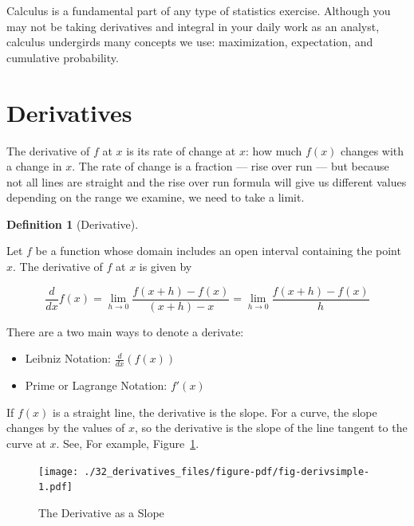 \documentclass[
  letterpaper,
]{book}
\providecommand{\tightlist}{%
  \setlength{\itemsep}{0pt}\setlength{\parskip}{0pt}}\usepackage{longtable,booktabs,array}
\theoremstyle{definition}
\newtheorem{definition}{Definition}[chapter]
\theoremstyle{definition}
\theoremstyle{plain}
\theoremstyle{definition}
\theoremstyle{plain}
\theoremstyle{plain}
\theoremstyle{remark}
\begin{document}
Calculus is a fundamental part of any type of statistics exercise.
Although you may not be taking derivatives and integral in your daily
work as an analyst, calculus undergirds many concepts we use:
maximization, expectation, and cumulative probability.

\hypertarget{sec-derivintro}{%
\section{Derivatives}\label{sec-derivintro}}

The derivative of \(f\) at \(x\) is its rate of change at \(x\): how
much \(f(x)\) changes with a change in \(x\). The rate of change is a
fraction --- rise over run --- but because not all lines are straight
and the rise over run formula will give us different values depending on
the range we examine, we need to take a limit.

\leavevmode{}%
\begin{definition}[Derivative]\label{def-derivative}

Let \(f\) be a function whose domain includes an open interval
containing the point \(x\). The derivative of \(f\) at \(x\) is given by

\[\frac{d}{dx}f(x) =\lim\limits_{h\to 0} \frac{f(x+h)-f(x)}{(x+h)-x} = \lim\limits_{h\to 0} \frac{f(x+h)-f(x)}{h}\]

There are a two main ways to denote a derivate:

\begin{itemize}
\tightlist
\item
  Leibniz Notation: \(\frac{d}{dx}(f(x))\)
\item
  Prime or Lagrange Notation: \(f'(x)\)
\end{itemize}

\end{definition}

If \(f(x)\) is a straight line, the derivative is the slope. For a
curve, the slope changes by the values of \(x\), so the derivative is
the slope of the line tangent to the curve at \(x\). See, For example,
Figure~\ref{fig-derivsimple}.

\begin{figure}

{\centering \texttt{[image: ./32\_derivatives\_files/figure-pdf/fig-derivsimple-1.pdf]}

}

\caption{\label{fig-derivsimple}The Derivative as a Slope}

\end{figure}
\end{document}
